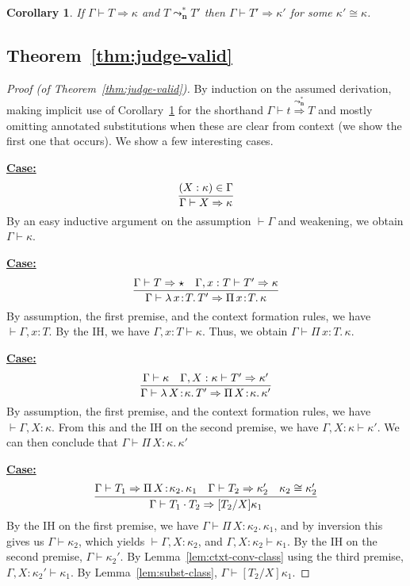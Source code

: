\documentclass{article}
\newcommand{\abs}[4]{{#1}\, #2\! : \! #3.\, #4}
\newcommand{\leadstocs}[0]{\ensuremath{\leadsto_{\mathbf{n}}^*}}
\newcommand{\tpsynth}[0]{\Rightarrow}
\newcommand{\tpsynthleads}[0]{\ensuremath{\overset{\leadstocs}{\Rightarrow}}}
\newcommand{\startcase}[1]{\vspace{#1} \noindent\textbf{\underline{Case:}}}
\newtheorem{corollary}[theorem]{Corollary}
\begin{document}
\begin{corollary}
  \label{cor:syntactic-kind-pres}
  If \(\Gamma \vdash T \tpsynth \kappa\) and \(T \leadstocs T'\) then
  \(\Gamma \vdash T' \tpsynth \kappa'\) for some \(\kappa' \cong \kappa\).
\end{corollary}

\subsection{Theorem~\ref{thm:judge-valid}}

\begin{proof}[Proof (of Theorem~\ref{thm:judge-valid})]
  By induction on the assumed derivation, making implicit use of
  Corollary~\ref{cor:syntactic-kind-pres} for the shorthand \(\Gamma \vdash t
  \tpsynthleads T\) and mostly omitting annotated substitutions when these are
  clear from context (we show the first one that occurs).
  We show a few interesting cases.

  \startcase{.2cm}
  \[
    \infer{\Gamma \vdash X \tpsynth \kappa}{(X : \kappa) \in \Gamma}
  \]
  By an easy inductive argument on the assumption \(\vdash \Gamma\) and
  weakening, we obtain \(\Gamma \vdash \kappa\).

  \startcase{.2cm}
  \[
    \infer{\Gamma\vdash\abs{\lambda}{x}{T}{T'} \tpsynth \abs{\Pi}{x}{T}{\kappa}}{\Gamma \vdash T \tpsynth \star & \Gamma,x:T\vdash T'\tpsynth\kappa}
  \]
  By assumption, the first premise, and the context formation rules, we have
  \(\vdash \Gamma,x:T\).
  By the IH, we have \(\Gamma,x:T \vdash \kappa\).
  Thus, we obtain \(\Gamma \vdash \abs{\Pi}{x}{T}{\kappa}\).

  \startcase{.2cm}
  \[
    \infer{\Gamma\vdash\abs{\lambda}{X}{\kappa}{T'} \tpsynth \abs{\Pi}{X}{\kappa}{\kappa'}}{\Gamma \vdash \kappa & \Gamma,X:\kappa\vdash T'\tpsynth\kappa'}
  \]
  By assumption, the first premise, and the context formation rules, we have
  \(\vdash \Gamma,X:\kappa\).
  From this and the IH on the second premise, we have \(\Gamma,X:\kappa \vdash
  \kappa'\).
  We can then conclude that \(\Gamma \vdash \abs{\Pi}{X}{\kappa}{\kappa'}\)

  
  \startcase{.2cm}
  \[
    \infer{\Gamma\vdash T_1 \cdot T_2 \tpsynth [T_2/X]\kappa_1}{\Gamma\vdash T_1 \tpsynth \abs{\Pi}{X}{\kappa_2}{\kappa_1} & \Gamma\vdash T_2 \tpsynth \kappa_2' & \kappa_2 \cong \kappa_2'}
  \]
  By the IH on the first premise, we have \(\Gamma \vdash
  \abs{\Pi}{X}{\kappa_2}{\kappa_1}\), and by inversion this gives us \(\Gamma
  \vdash \kappa_2\), which yields \(\vdash \Gamma,X:\kappa_2\), and
  \(\Gamma,X:\kappa_2 \vdash \kappa_1\).
  By the IH on the second premise, \(\Gamma \vdash \kappa_2'\).
  By Lemma~\ref{lem:ctxt-conv-class} using the third premise,
  \(\Gamma,X:\kappa_2' \vdash \kappa_1\).
  By Lemma~\ref{lem:subst-class}, \(\Gamma \vdash [T_2/X]\kappa_1\).


\end{proof}
\end{document}
